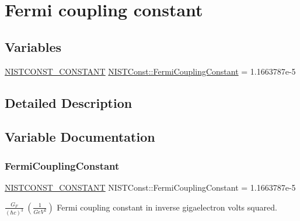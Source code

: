 \hypertarget{group___n_i_s_t_const-_fermi_coupling_constant}{}\section{Fermi coupling constant}
\label{group___n_i_s_t_const-_fermi_coupling_constant}
\subsection*{Variables}
\begin{DoxyCompactItemize}
\item 
\mbox{\hyperlink{_n_i_s_t_const_8hpp_a2b0fc1d7452373f816175dd86ce26729}{N\+I\+S\+T\+C\+O\+N\+S\+T\+\_\+\+C\+O\+N\+S\+T\+A\+NT}} \mbox{\hyperlink{group___n_i_s_t_const-_fermi_coupling_constant_ga2bf2a03b5ea1bb506508e9c65b24dd52}{N\+I\+S\+T\+Const\+::\+Fermi\+Coupling\+Constant}} = 1.\+1663787e-\/5
\end{DoxyCompactItemize}


\subsection{Detailed Description}


\subsection{Variable Documentation}
\mbox{\label{group___n_i_s_t_const-_fermi_coupling_constant_ga2bf2a03b5ea1bb506508e9c65b24dd52}} 
\subsubsection{\texorpdfstring{Fermi\+Coupling\+Constant}{FermiCouplingConstant}}
{\footnotesize\ttfamily \mbox{\hyperlink{_n_i_s_t_const_8hpp_a2b0fc1d7452373f816175dd86ce26729}{N\+I\+S\+T\+C\+O\+N\+S\+T\+\_\+\+C\+O\+N\+S\+T\+A\+NT}} N\+I\+S\+T\+Const\+::\+Fermi\+Coupling\+Constant = 1.\+1663787e-\/5}

$\frac{G_F}{(\hbar c)^3} \ (\frac{1}{GeV^2})$ Fermi coupling constant in inverse gigaelectron volts squared. 